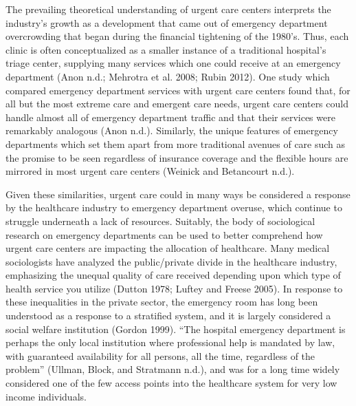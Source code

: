 \documentclass[12pt,twoside]{reedthesis}
\begin{document}
  The prevailing theoretical understanding of urgent care centers
  interprets the industry's growth as a development that came out of
  emergency department overcrowding that began during the financial
  tightening of the 1980's. Thus, each clinic is often conceptualized as a
  smaller instance of a traditional hospital's triage center, supplying
  many services which one could receive at an emergency department (Anon
  n.d.; Mehrotra et al. 2008; Rubin 2012). One study which compared
  emergency department services with urgent care centers found that, for
  all but the most extreme care and emergent care needs, urgent care
  centers could handle almost all of emergency department traffic and that
  their services were remarkably analogous (Anon n.d.). Similarly, the
  unique features of emergency departments which set them apart from more
  traditional avenues of care such as the promise to be seen regardless of
  insurance coverage and the flexible hours are mirrored in most urgent
  care centers (Weinick and Betancourt n.d.).
  
  Given these similarities, urgent care could in many ways be considered a
  response by the healthcare industry to emergency department overuse,
  which continue to struggle underneath a lack of resources. Suitably, the
  body of sociological research on emergency departments can be used to
  better comprehend how urgent care centers are impacting the allocation
  of healthcare. Many medical sociologists have analyzed the
  public/private divide in the healthcare industry, emphasizing the
  unequal quality of care received depending upon which type of health
  service you utilize (Dutton 1978; Luftey and Freese 2005). In response
  to these inequalities in the private sector, the emergency room has long
  been understood as a response to a stratified system, and it is largely
  considered a social welfare institution (Gordon 1999). ``The hospital
  emergency department is perhaps the only local institution where
  professional help is mandated by law, with guaranteed availability for
  all persons, all the time, regardless of the problem'' (Ullman, Block,
  and Stratmann n.d.), and was for a long time widely considered one of
  the few access points into the healthcare system for very low income
  individuals.
  
\end{document}
